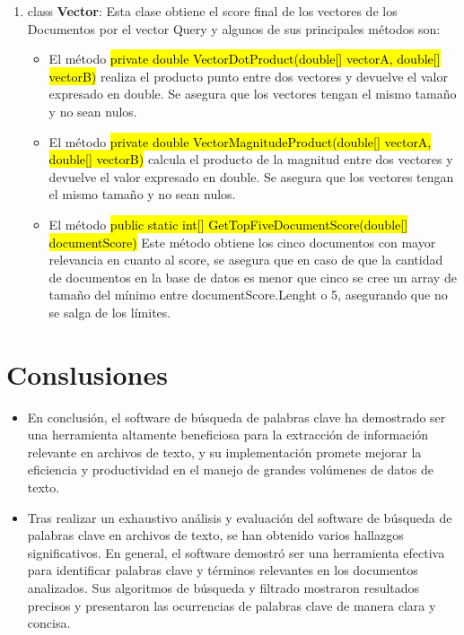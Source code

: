 \documentclass{article}
\begin{document}
\begin{itemize}
\begin{enumerate}
\begin{itemize}
                \end{itemize}

            \item class \textbf{Vector}: Esta clase obtiene el score final de los vectores de los Documentos por el
            vector Query y algunos de sus principales métodos son:
                \begin{itemize}
                    \item El método \hl{private double VectorDotProduct(double[] vectorA, double[]
                    vectorB)} realiza el producto punto entre dos vectores y devuelve el valor expresado
                    en double. Se asegura que los vectores tengan el mismo tamaño y no sean nulos.

                    \item El método \hl{private double VectorMagnitudeProduct(double[] vectorA,
                    double[] vectorB)} calcula el producto de la magnitud entre dos vectores y
                    devuelve el valor expresado en double. Se asegura que los vectores tengan el mismo
                    tamaño y no sean nulos.

                    \item El método \hl{public static int[] GetTopFiveDocumentScore(double[]
                    documentScore)} Este método obtiene los cinco documentos con mayor relevancia
                    en cuanto al score, se asegura que en caso de que la cantidad de documentos en la
                    base de datos es menor que cinco se cree un array de tamaño del mínimo entre
                    documentScore.Lenght o 5, asegurando que no se salga de los límites.
                \end{itemize}
        \end{enumerate}
    \end{itemize}
    \section*{Conslusiones}
    \begin{itemize}
        \item En conclusión, el software de búsqueda de palabras clave ha demostrado ser una herramienta altamente beneficiosa para la extracción de información relevante en archivos de texto, y su implementación promete mejorar la eficiencia y productividad en el manejo de grandes volúmenes de datos de texto.
        \item Tras realizar un exhaustivo análisis y evaluación del software de búsqueda de palabras clave en archivos de texto, se han obtenido varios hallazgos significativos. En general, el software demostró ser una herramienta efectiva para identificar palabras clave y términos relevantes en los documentos analizados. Sus algoritmos de búsqueda y filtrado mostraron resultados precisos y presentaron las ocurrencias de palabras clave de manera clara y concisa.
    \end{itemize}
    
\end{document}
